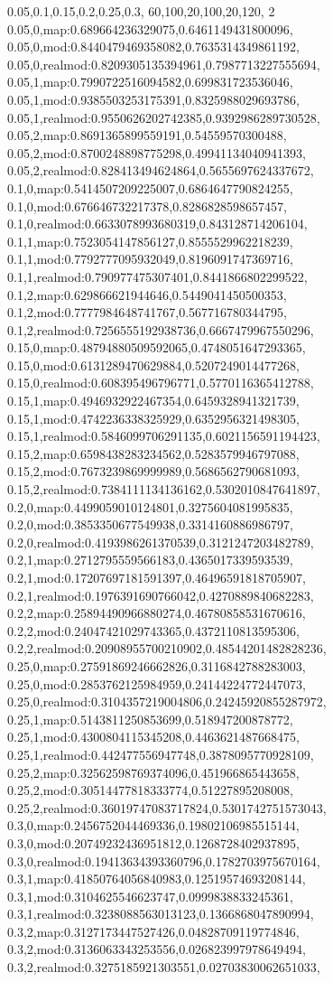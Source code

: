 0.05,0.1,0.15,0.2,0.25,0.3,
60,100,20,100,20,120,
2
0.05,0,map:0.689664236329075,0.6461149431800096,
0.05,0,mod:0.8440479469358082,0.7635314349861192,
0.05,0,realmod:0.8209305135394961,0.7987713227555694,
0.05,1,map:0.7990722516094582,0.699831723536046,
0.05,1,mod:0.9385503253175391,0.8325988029693786,
0.05,1,realmod:0.9550626202742385,0.9392986289730528,
0.05,2,map:0.8691365899559191,0.54559570300488,
0.05,2,mod:0.8700248898775298,0.49941134040941393,
0.05,2,realmod:0.828413494624864,0.5655697624337672,
0.1,0,map:0.5414507209225007,0.6864647790824255,
0.1,0,mod:0.676646732217378,0.8286828598657457,
0.1,0,realmod:0.6633078993680319,0.843128714206104,
0.1,1,map:0.7523054147856127,0.8555529962218239,
0.1,1,mod:0.7792777095932049,0.8196091747369716,
0.1,1,realmod:0.790977475307401,0.8441866802299522,
0.1,2,map:0.629866621944646,0.5449041450500353,
0.1,2,mod:0.7777984648741767,0.567716780344795,
0.1,2,realmod:0.7256555192938736,0.6667479967550296,
0.15,0,map:0.48794880509592065,0.4748051647293365,
0.15,0,mod:0.6131289470629884,0.5207249014477268,
0.15,0,realmod:0.608395496796771,0.5770116365412788,
0.15,1,map:0.4946932922467354,0.6459328941321739,
0.15,1,mod:0.4742236338325929,0.6352956321498305,
0.15,1,realmod:0.5846099706291135,0.6021156591194423,
0.15,2,map:0.6598438283234562,0.5283579946797088,
0.15,2,mod:0.7673239869999989,0.5686562790681093,
0.15,2,realmod:0.7384111134136162,0.5302010847641897,
0.2,0,map:0.4499059010124801,0.3275604081995835,
0.2,0,mod:0.3853350677549938,0.3314160886986797,
0.2,0,realmod:0.4193986261370539,0.3121247203482789,
0.2,1,map:0.2712795559566183,0.4365017339593539,
0.2,1,mod:0.17207697181591397,0.46496591818705907,
0.2,1,realmod:0.1976391690766042,0.4270889840682283,
0.2,2,map:0.25894490966880274,0.46780858531670616,
0.2,2,mod:0.24047421029743365,0.4372110813595306,
0.2,2,realmod:0.20908955700210902,0.48544201482828236,
0.25,0,map:0.27591869246662826,0.3116842788283003,
0.25,0,mod:0.2853762125984959,0.24144224772447073,
0.25,0,realmod:0.3104357219004806,0.24245920855287972,
0.25,1,map:0.5143811250853699,0.518947200878772,
0.25,1,mod:0.4300804115345208,0.4463621487668475,
0.25,1,realmod:0.442477556947748,0.3878095770928109,
0.25,2,map:0.32562598769374096,0.451966865443658,
0.25,2,mod:0.30514477818333774,0.51227895208008,
0.25,2,realmod:0.36019747083717824,0.5301742751573043,
0.3,0,map:0.2456752044469336,0.19802106985515144,
0.3,0,mod:0.20749232436951812,0.1268728402937895,
0.3,0,realmod:0.19413634393360796,0.1782703975670164,
0.3,1,map:0.41850764056840983,0.12519574693208144,
0.3,1,mod:0.3104625546623747,0.0999838833245361,
0.3,1,realmod:0.3238088563013123,0.1366868047890994,
0.3,2,map:0.3127173447527426,0.04828709119774846,
0.3,2,mod:0.3136063343253556,0.026823997978649494,
0.3,2,realmod:0.3275185921303551,0.02703830062651033,
